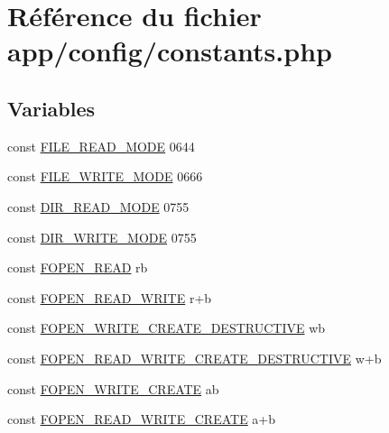 \hypertarget{constants_8php}{}\section{Référence du fichier app/config/constants.php}
\label{constants_8php}
\subsection*{Variables}
\begin{DoxyCompactItemize}
\item 
const \hyperlink{constants_8php_afa80a675a7a8436c2b299e41c63fd405}{F\+I\+L\+E\+\_\+\+R\+E\+A\+D\+\_\+\+M\+O\+DE} 0644
\item 
const \hyperlink{constants_8php_a6b9fcdc9259bf9361e8f97e289024242}{F\+I\+L\+E\+\_\+\+W\+R\+I\+T\+E\+\_\+\+M\+O\+DE} 0666
\item 
const \hyperlink{constants_8php_a5eb43292f0c56482a7869db8adb1c91d}{D\+I\+R\+\_\+\+R\+E\+A\+D\+\_\+\+M\+O\+DE} 0755
\item 
const \hyperlink{constants_8php_aac7345ea170768d48be7cde8ebf6b147}{D\+I\+R\+\_\+\+W\+R\+I\+T\+E\+\_\+\+M\+O\+DE} 0755
\item 
const \hyperlink{constants_8php_ab6a0a1c6e9ea5f7625b2dba2f7bd286c}{F\+O\+P\+E\+N\+\_\+\+R\+E\+AD} \textquotesingle{}rb\textquotesingle{}
\item 
const \hyperlink{constants_8php_ab98552969950ea978284c998e10d0153}{F\+O\+P\+E\+N\+\_\+\+R\+E\+A\+D\+\_\+\+W\+R\+I\+TE} \textquotesingle{}r+b\textquotesingle{}
\item 
const \hyperlink{constants_8php_a246692af603ceac463cab532d81a6048}{F\+O\+P\+E\+N\+\_\+\+W\+R\+I\+T\+E\+\_\+\+C\+R\+E\+A\+T\+E\+\_\+\+D\+E\+S\+T\+R\+U\+C\+T\+I\+VE} \textquotesingle{}wb\textquotesingle{}
\item 
const \hyperlink{constants_8php_a1b8581dfce24061e847cc257aed23d62}{F\+O\+P\+E\+N\+\_\+\+R\+E\+A\+D\+\_\+\+W\+R\+I\+T\+E\+\_\+\+C\+R\+E\+A\+T\+E\+\_\+\+D\+E\+S\+T\+R\+U\+C\+T\+I\+VE} \textquotesingle{}w+b\textquotesingle{}
\item 
const \hyperlink{constants_8php_a7c5689a170bbaab4dd9c6f3a76bd7a0d}{F\+O\+P\+E\+N\+\_\+\+W\+R\+I\+T\+E\+\_\+\+C\+R\+E\+A\+TE} \textquotesingle{}ab\textquotesingle{}
\item 
const \hyperlink{constants_8php_adcd04289bf4dc262b7652cb4c1eb08f7}{F\+O\+P\+E\+N\+\_\+\+R\+E\+A\+D\+\_\+\+W\+R\+I\+T\+E\+\_\+\+C\+R\+E\+A\+TE} \textquotesingle{}a+b\textquotesingle{}
\item 

\end{DoxyCompactItemize}
